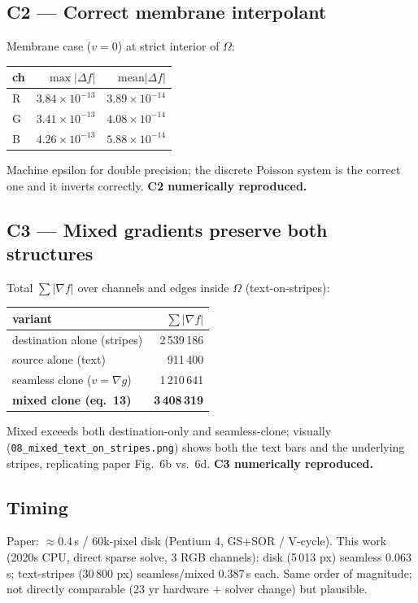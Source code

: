 \documentclass[11pt]{article}
\begin{document}
\subsection*{C2 --- Correct membrane interpolant}
Membrane case (\(v=0\)) at strict interior of \(\Omega\):
\begin{center}
\begin{tabular}{lrr}
\toprule
ch & \(\max|\Delta f|\) & \(\text{mean}|\Delta f|\) \\
\midrule
R & \(3.84\times 10^{-13}\) & \(3.89\times 10^{-14}\) \\
G & \(3.41\times 10^{-13}\) & \(4.08\times 10^{-14}\) \\
B & \(4.26\times 10^{-13}\) & \(5.88\times 10^{-14}\) \\
\bottomrule
\end{tabular}
\end{center}
Machine epsilon for double precision; the discrete Poisson system is the
correct one and it inverts correctly. \textbf{C2 numerically reproduced.}

\subsection*{C3 --- Mixed gradients preserve both structures}
Total \(\sum|\nabla f|\) over channels and edges inside \(\Omega\)
(text-on-stripes):
\begin{center}
\begin{tabular}{lr}
\toprule
variant & \(\sum|\nabla f|\) \\
\midrule
destination alone (stripes) & 2\,539\,186 \\
source alone (text)         &   911\,400 \\
seamless clone (\(v=\nabla g\)) & 1\,210\,641 \\
\textbf{mixed clone (eq.\ 13)} & \textbf{3\,408\,319} \\
\bottomrule
\end{tabular}
\end{center}
Mixed exceeds both destination-only and seamless-clone; visually
(\texttt{08\_mixed\_text\_on\_stripes.png}) shows both the text bars and the
underlying stripes, replicating paper Fig.\ 6b vs.\ 6d.
\textbf{C3 numerically reproduced.}

\subsection*{Timing}
Paper: \(\approx 0.4\)\,s / 60k-pixel disk (Pentium 4, GS+SOR / V-cycle).
This work (2020s CPU, direct sparse solve, 3 RGB channels): disk (5\,013 px)
seamless 0.063\,s; text-stripes (30\,800 px) seamless/mixed 0.387\,s each.
Same order of magnitude; not directly comparable (23 yr hardware $+$ solver
change) but plausible.
\end{document}
